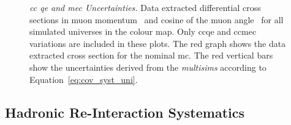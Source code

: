 \begin{figure}[t]
\centering
{}
\caption[\acrshort{cc} \acrshort{qe} and \acrshort{mec} Uncertainties - Universes Distributions]{\emph{\acrshort{cc} \acrshort{qe} and \acrshort{mec} Uncertainties.} Data extracted differential cross sections in muon momentum~\protect{} and cosine of the muon angle~\protect{} for all simulated universes in the colour map. Only \acrshort{cc}\acrshort{qe} and \acrshort{cc}\acrshort{mec} variations are included in these plots. The red graph shows the data extracted cross section for the nominal \acrshort{mc}. The red vertical bars show the uncertainties derived from the \emph{multisims} according to Equation~\eqref{eq:cov_syst_uni}.}
\label{fig:ccqe_ccmec_multisim}
\end{figure}







\subsection{Hadronic Re-Interaction Systematics}
\label{sec:error_reint}


